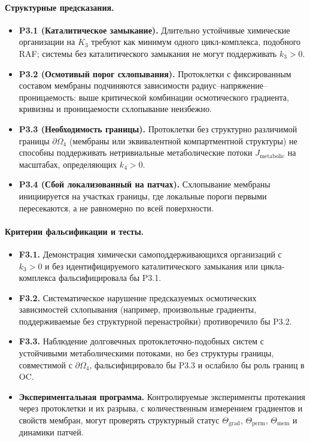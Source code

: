 \paragraph{Структурные предсказания.}
\begin{itemize}
  \item \textbf{P3.1 (Каталитическое замыкание).}
        Длительно устойчивые химические организации на \(K_3\) требуют как
        минимум одного цикл-комплекса, подобного RAF; системы без каталитического
        замыкания не могут поддерживать \(k_3>0\).
  \item \textbf{P3.2 (Осмотивый порог схлопывания).}
        Протоклетки с фиксированным составом мембраны подчиняются
        зависимости радиус–напряжение–проницаемость: выше критической
        комбинации осмотического градиента, кривизны и проницаемости
        схлопывание неизбежно.
  \item \textbf{P3.3 (Необходимость границы).}
        Протоклетки без структурно различимой границы
        \(\partial\Omega_4\) (мембраны или эквивалентной компартментной
        структуры) не способны поддерживать нетривиальные метаболические
        потоки \(J_{\mathrm{metabolic}}\) на масштабах, определяющих
        \(k_4>0\).
  \item \textbf{P3.4 (Сбой локализованный на патчах).}
        Схлопывание мембраны инициируется на участках границы, где локальные
        пороги первыми пересекаются, а не равномерно по всей поверхности.
\end{itemize}

\paragraph{Критерии фальсификации и тесты.}
\begin{itemize}
  \item \textbf{F3.1.}
        Демонстрация химически самоподдерживающихся организаций с
        \(k_3>0\) и без идентифицируемого каталитического замыкания или
        цикла-комплекса фальсифицировала бы P3.1.
  \item \textbf{F3.2.}
        Систематическое нарушение предсказуемых осмотических зависимостей
        схлопывания (например, произвольные градиенты, поддерживаемые без
        структурной перенастройки) противоречило бы P3.2.
  \item \textbf{F3.3.}
        Наблюдение долговечных протоклеточно-подобных систем с устойчивыми
        метаболическими потоками, но без структуры границы,
        совместимой с \(\partial\Omega_4\), фальсифицировало бы P3.3 и
        ослабило бы роль границ в OC.
  \item \textbf{Экспериментальная программа.}
        Контролируемые эксперименты протекания через протоклетки и их
        разрыва, с количественным измерением градиентов и свойств
        мембран, могут проверять структурный статус
        \(\Theta_{\mathrm{grad}}\), \(\Theta_{\mathrm{perm}}\),
        \(\Theta_{\mathrm{mem}}\) и динамики патчей.
\end{itemize}

